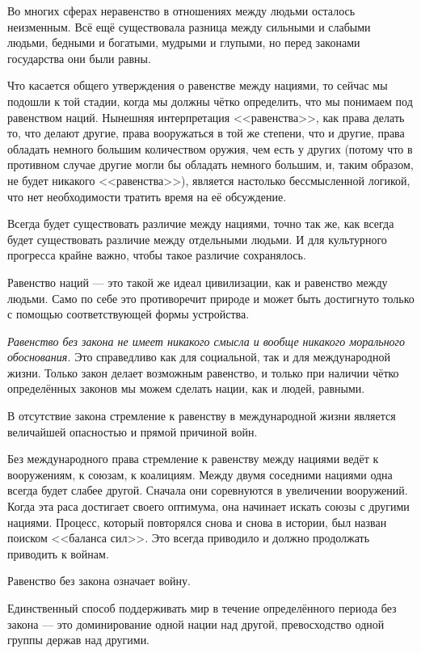 Во многих сферах неравенство в отношениях между людьми осталось неизменным. Всё ещё существовала разница между сильными и слабыми людьми, бедными и богатыми, мудрыми и глупыми, но перед законами государства они были равны.

Что касается общего утверждения о равенстве между нациями, то сейчас мы подошли к той стадии, когда мы должны чётко определить, что мы понимаем под равенством наций. Нынешняя интерпретация <<равенства>>, как права делать то, что делают другие, права вооружаться в той же степени, что и другие, права обладать немного большим количеством оружия, чем есть у других (потому что в противном случае другие могли бы обладать немного большим, и, таким образом, не будет никакого <<равенства>>), является настолько бессмысленной логикой, что нет необходимости тратить время на её обсуждение.

Всегда будет существовать различие между нациями, точно так же, как всегда будет существовать различие между отдельными людьми. И для культурного прогресса крайне важно, чтобы такое различие сохранялось.

Равенство наций — это такой же идеал цивилизации, как и равенство между людьми. Само по себе это противоречит природе и может быть достигнуто только с помощью соответствующей формы устройства.

\textit{Равенство без закона не имеет никакого смысла и вообще никакого морального обоснования.} Это справедливо как для социальной, так и для международной жизни. Только закон делает возможным равенство, и только при наличии чётко определённых законов мы можем сделать нации, как и людей, равными.

В отсутствие закона стремление к равенству в международной жизни является величайшей опасностью и прямой причиной войн.

Без международного права стремление к равенству между нациями ведёт к вооружениям, к союзам, к коалициям. Между двумя соседними нациями одна всегда будет слабее другой. Сначала они соревнуются в увеличении вооружений. Когда эта раса достигает своего оптимума, она начинает искать союзы с другими нациями. Процесс, который повторялся снова и снова в истории, был назван поиском <<баланса сил>>. Это всегда приводило и должно продолжать приводить к войнам.

Равенство без закона означает войну.

Единственный способ поддерживать мир в течение определённого периода без закона — это доминирование одной нации над другой, превосходство одной группы держав над другими.

